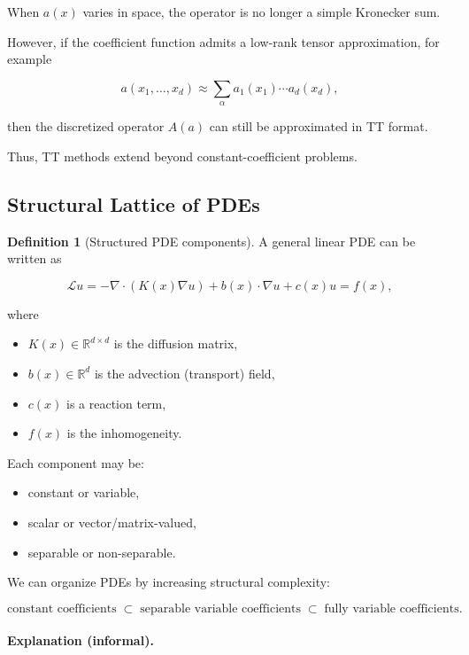 \documentclass[11pt,a4paper,parskip=half-]{scrartcl}
\theoremstyle{definition}
\newtheorem{definition}{Definition}[section]
\theoremstyle{plain}
\theoremstyle{remark}
\begin{document}
When $a(x)$ varies in space, the operator is no longer a simple Kronecker sum.

However, if the coefficient function admits a low-rank tensor approximation, for
example

\[
  a(x_1,\dots,x_d)
  \approx
  \sum_\alpha
  a_1(x_1)\cdots a_d(x_d),
\]

then the discretized operator $A(a)$ can still be approximated in TT format.

Thus, TT methods extend beyond constant-coefficient problems.

\subsection{Structural Lattice of PDEs}

\begin{definition}[Structured PDE components]

A general linear PDE can be written as

\[
  \mathcal{L}u
  =
  -\nabla \cdot (K(x)\nabla u)
  + b(x)\cdot \nabla u
  + c(x)u
  = f(x),
\]

where

\begin{itemize}
  \item $K(x) \in \mathbb{R}^{d \times d}$ is the diffusion matrix,
  \item $b(x) \in \mathbb{R}^d$ is the advection (transport) field,
  \item $c(x)$ is a reaction term,
  \item $f(x)$ is the inhomogeneity.
\end{itemize}

Each component may be:
\begin{itemize}
  \item constant or variable,
  \item scalar or vector/matrix-valued,
  \item separable or non-separable.
\end{itemize}

\end{definition}
We can organize PDEs by increasing structural complexity:

\[
\text{constant coefficients}
\;\subset\;
\text{separable variable coefficients}
\;\subset\;
\text{fully variable coefficients}.
\]

\paragraph{Explanation (informal).}
\end{document}
